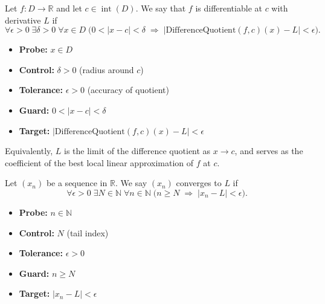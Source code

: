 \begin{definition}
Let $f : D \to \mathbb{R}$ and let $c \in \operatorname{int}(D)$. We say that $f$ is differentiable at $c$ with derivative $L$ if
\[
\forall \epsilon > 0\;\exists \delta > 0\;\forall x \in D\;
\Big(
0 < |x - c| < \delta
\;\Rightarrow\;
\big|
\mathrm{DifferenceQuotient}(f,c)(x) - L
\big| < \epsilon
\Big).
\]

\begin{itemize}
    \item \textbf{Probe:} $x \in D$
    \item \textbf{Control:} $\delta > 0$ (radius around $c$)
    \item \textbf{Tolerance:} $\epsilon > 0$ (accuracy of quotient)
    \item \textbf{Guard:} $0 < |x - c| < \delta$
    \item \textbf{Target:} $\big|\mathrm{DifferenceQuotient}(f,c)(x) - L\big| < \epsilon$
\end{itemize}

Equivalently, $L$ is the limit of the difference quotient as $x \to c$, and serves as the coefficient of the best local linear approximation of $f$ at $c$.
\end{definition}




\begin{definition}
Let $(x_n)$ be a sequence in $\mathbb{R}$. We say $(x_n)$ converges to $L$ if
\[
\forall \epsilon > 0\;\exists N \in \mathbb{N}\;\forall n \in \mathbb{N}\;
\Big(
n \geq N
\;\Rightarrow\;
|x_n - L| < \epsilon
\Big).
\]

\begin{itemize}
    \item \textbf{Probe:} $n \in \mathbb{N}$
    \item \textbf{Control:} $N$ (tail index)
    \item \textbf{Tolerance:} $\epsilon > 0$
    \item \textbf{Guard:} $n \geq N$
    \item \textbf{Target:} $|x_n - L| < \epsilon$
\end{itemize}
\end{definition}





